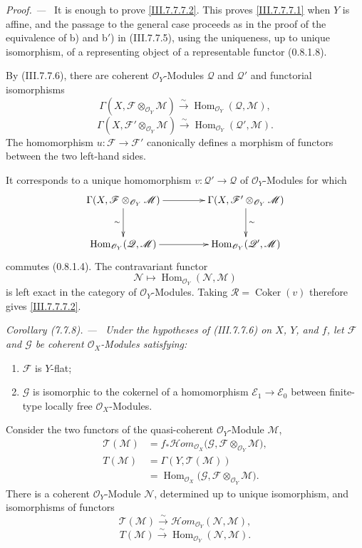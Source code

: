 \documentclass[10pt,oneside]{book}
\newcommand{\sh}[1]{\mathscr{#1}}
\newcommand{\Hom}{\operatorname{Hom}}
\newcommand{\Coker}{\operatorname{Coker}}
\newcommand{\simto}{\xrightarrow{\sim}}
\newcommand{\shHom}{\mathscr{H}\!om}
\newcommand{\sref}[2][]{(#2)}
\newcommand{\oldpage}[2][]{\setcounter{footnote}{0}\marginpar{\scriptsize\textbf{#1}~|~#2}\ignorespaces}
\newenvironment{corollary}[1][]{\par\medskip\noindent\itshape Corollary (#1). ---\ }{\par}
\newenvironment{proof}{\par\medskip\noindent\textit{Proof. ---\ }}{\par}
\begin{document}
\begin{proof}
It is enough to prove \eqref{III.7.7.7.2}.  This proves
\eqref{III.7.7.7.1} when $Y$ is affine, and the passage to
the general case proceeds as in the proof of the equivalence
of b) and b$'$) in \sref{III.7.7.5}, using the uniqueness,
up to unique isomorphism, of a representing object of a
representable functor \sref[0]{0.8.1.8}.

By \sref{III.7.7.6}, there are coherent
$\sh{O}_Y$-Modules $\sh{Q}$ and $\sh{Q}'$ and functorial
isomorphisms
\[
  \Gamma(X,\sh{F}\otimes_{\sh{O}_Y}\sh{M})
  \simto
  \Hom_{\sh{O}_Y}(\sh{Q},\sh{M}),
\]
\[
  \Gamma(X,\sh{F}'\otimes_{\sh{O}_Y}\sh{M})
  \simto
  \Hom_{\sh{O}_Y}(\sh{Q}',\sh{M}).
\]
The homomorphism $u:\sh{F}\to\sh{F}'$ canonically defines a
morphism of functors between the two left-hand sides.

\oldpage[III]{202}
It corresponds to a unique homomorphism
$v:\sh{Q}'\to\sh{Q}$ of $\sh{O}_Y$-Modules for which
\[
\xymatrix@C=42pt@R=28pt{
  \Gamma(X,\sh{F}\otimes_{\sh{O}_Y}\sh{M})
    \ar[r]\ar[d]_-{\sim}
  &
  \Gamma(X,\sh{F}'\otimes_{\sh{O}_Y}\sh{M})
    \ar[d]^-{\sim}
  \\
  \Hom_{\sh{O}_Y}(\sh{Q},\sh{M})
    \ar[r]
  &
  \Hom_{\sh{O}_Y}(\sh{Q}',\sh{M})
}
\]
commutes \sref[0]{0.8.1.4}.  The contravariant functor
\[
  \sh{N}\longmapsto
  \Hom_{\sh{O}_Y}(\sh{N},\sh{M})
\]
is left exact in the category of $\sh{O}_Y$-Modules.
Taking $\sh{R}=\Coker(v)$ therefore gives
\eqref{III.7.7.7.2}.
\end{proof}

\begin{corollary}[7.7.8]
\label{III.7.7.8}
Under the hypotheses of \sref{III.7.7.6} on $X$, $Y$, and
$f$, let $\sh{F}$ and $\sh{G}$ be coherent
$\sh{O}_X$-Modules satisfying:
\begin{enumerate}
  \item[(i)] $\sh{F}$ is $Y$-flat;
  \item[(ii)] $\sh{G}$ is isomorphic to the cokernel of a
    homomorphism
    $\sh{E}_1\to\sh{E}_0$ between finite-type locally free
    $\sh{O}_X$-Modules.
\end{enumerate}
Consider the two functors of the quasi-coherent
$\sh{O}_Y$-Module $\sh{M}$,
\begin{align*}
  \sh{T}(\sh{M})
  &=
  f_*\shHom_{\sh{O}_X}
  \bigl(
    \sh{G},
    \sh{F}\otimes_{\sh{O}_Y}\sh{M}
  \bigr),\\
  T(\sh{M})
  &=
  \Gamma(Y,\sh{T}(\sh{M}))\\
  &=
  \Hom_{\sh{O}_X}
  \bigl(
    \sh{G},
    \sh{F}\otimes_{\sh{O}_Y}\sh{M}
  \bigr).
\end{align*}
There is a coherent $\sh{O}_Y$-Module $\sh{N}$, determined
up to unique isomorphism, and isomorphisms of functors
\[
  \sh{T}(\sh{M})
  \simto
  \shHom_{\sh{O}_Y}(\sh{N},\sh{M}),
  \tag{7.7.8.1}\label{III.7.7.8.1}
\]
\[
  T(\sh{M})
  \simto
  \Hom_{\sh{O}_Y}(\sh{N},\sh{M}).
  \tag{7.7.8.2}\label{III.7.7.8.2}
\]
\end{corollary}
\end{document}
